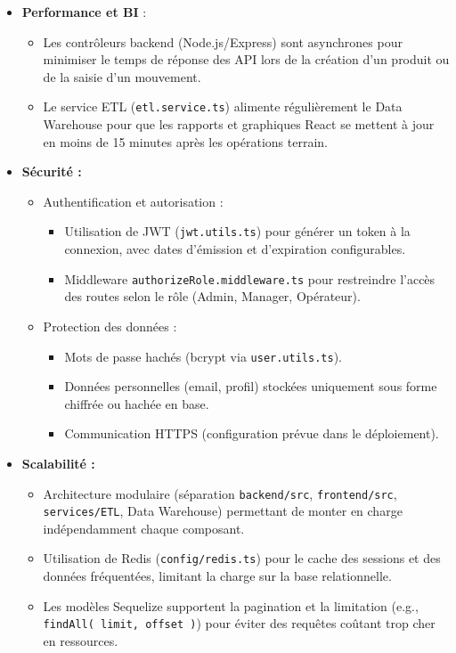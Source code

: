 \documentclass[12pt,a4paper]{report}
\begin{document}
\begin{itemize}
  \item \textbf{Performance et BI} :  
    \begin{itemize}
      \item Les contrôleurs backend (Node.js/Express) sont asynchrones pour minimiser le temps de réponse des API lors de la création d’un produit ou de la saisie d’un mouvement.  
      \item Le service ETL (\texttt{etl.service.ts}) alimente régulièrement le Data Warehouse pour que les rapports et graphiques React se mettent à jour en moins de 15 minutes après les opérations terrain.  
    \end{itemize}

  \item \textbf{Sécurité :}  
    \begin{itemize}
      \item Authentification et autorisation :  
        \begin{itemize}
          \item Utilisation de JWT (\texttt{jwt.utils.ts}) pour générer un token à la connexion, avec dates d’émission et d’expiration configurables.  
          \item Middleware \texttt{authorizeRole.middleware.ts} pour restreindre l’accès des routes selon le rôle (Admin, Manager, Opérateur).  
        \end{itemize}
      \item Protection des données :  
        \begin{itemize}
          \item Mots de passe hachés (bcrypt via \texttt{user.utils.ts}).  
          \item Données personnelles (email, profil) stockées uniquement sous forme chiffrée ou hachée en base.  
          \item Communication HTTPS (configuration prévue dans le déploiement).  
        \end{itemize}
    \end{itemize}

  \item \textbf{Scalabilité :}  
    \begin{itemize}
      \item Architecture modulaire (séparation \texttt{backend/src}, \texttt{frontend/src}, \texttt{services/ETL}, Data Warehouse) permettant de monter en charge indépendamment chaque composant.  
      \item Utilisation de Redis (\texttt{config/redis.ts}) pour le cache des sessions et des données fréquentées, limitant la charge sur la base relationnelle.  
      \item Les modèles Sequelize supportent la pagination et la limitation (e.g., \texttt{findAll({ limit, offset })}) pour éviter des requêtes coûtant trop cher en ressources.
    \end{itemize}


\end{itemize}
\end{document}

